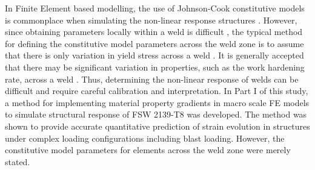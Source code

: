 	In Finite Element based modelling, the use of Johnson-Cook constitutive models is commonplace when simulating the non-linear response structures \cite{Grujicic2011,McWilliams2013}. However, since obtaining parameters locally within a weld is difficult \cite{Genevois2006}, the typical method for defining the constitutive model parameters across the weld zone is to assume that there is only variation in yield stress across a weld \cite{Grujicic2011,McWilliams2013}. It is generally accepted that there may be significant variation in properties, such as the work hardening rate, across a weld \cite{Grujicic2012,McWilliams2013,Sullivan2011}. Thus, determining the non-linear response of welds can be difficult and require careful calibration and interpretation.	In Part I of this study, a method for implementing material property gradients in macro scale FE models to simulate structural response of FSW 2139-T8 was developed. The method was shown to provide accurate quantitative prediction of strain evolution in structures under complex loading configurations including blast loading. However, the constitutive model parameters for elements across the weld zone were merely stated. 
	
